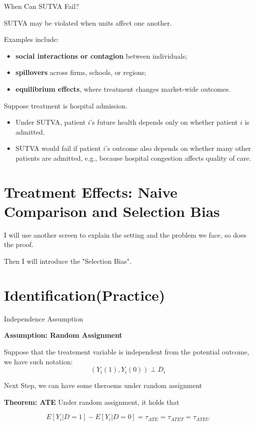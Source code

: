 \documentclass[11pt,aspectratio=169]{beamer}
\begin{document}
\begin{frame}{When Can SUTVA Fail?}

SUTVA may be violated when units affect one another.

Examples include:
\begin{itemize}
    \item \textbf{social interactions or contagion} between individuals;
    \item \textbf{spillovers} across firms, schools, or regions;
    \item \textbf{equilibrium effects}, where treatment changes market-wide outcomes.
\end{itemize}

Suppose treatment is hospital admission.
\begin{itemize}
    \item Under SUTVA, patient $i$'s future health depends only on whether patient $i$ is admitted.
    \item SUTVA would fail if patient $i$'s outcome also depends on whether many other patients are admitted, e.g., because hospital congestion affects quality of care.
\end{itemize}
\end{frame}


\section{Treatment Effects: Naive Comparison and Selection Bias}

\begin{frame}
I will use another screen to explain the setting and the problem we face, so does the proof.

Then I will introduce the "Selection Bias".
\end{frame}



\section{Identification(Practice)}

\begin{frame}{Independence Assumption}

\textbf{Assumption: Random Assignment}
\begin{theorembox}
Suppose that the treatement variable is independent from the potential outcome, we have such notation:$$(Y_i(1),Y_i(0))\perp D_i$$
\end{theorembox}

Next Step, we can have some theroems under random assignment

\end{frame}
\begin{frame}
\textbf{Theorem: ATE}
Under random assignment, it holds that 
\begin{theorembox}
$$E[Y_i\vert D=1]-E[Y_i\vert D=0] =\tau_{ATE}=\tau_{ATET}=\tau_{ATEU}$$

\end{theorembox}


\end{frame}
\end{document}
